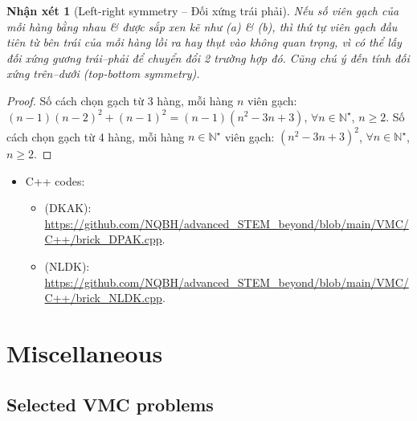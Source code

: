 \documentclass{article}
\newtheorem{nhanxet}{Nhận xét}
\begin{document}
\begin{nhanxet}[Left-right symmetry -- Đối xứng trái phải]
	Nếu số viên gạch của mỗi hàng bằng nhau \& được sắp xen kẽ như (a) \& (b), thì thứ tự viên gạch đầu tiên từ bên trái của mỗi hàng lồi ra hay thụt vào không quan trọng, vì có thể lấy đối xứng gương trái--phải để chuyển đổi 2 trường hợp đó. Cũng chú ý đến tính đối xứng trên--dưới (top-bottom symmetry).
\end{nhanxet}

\begin{proof}
	Số cách chọn gạch từ 3 hàng, mỗi hàng $n$ viên gạch: $(n - 1)(n - 2)^2 + (n - 1)^2 = (n - 1)(n^2 - 3n + 3)$, $\forall n\in\mathbb{N}^\star$, $n\ge2$. Số cách chọn gạch từ 4 hàng, mỗi hàng $n\in\mathbb{N}^\star$ viên gạch: $(n^2 - 3n + 3)^2$, $\forall n\in\mathbb{N}^\star$, $n\ge2$.
\end{proof}

\begin{itemize}
	\item C++ codes:
	\begin{itemize}
		\item (DKAK): \url{https://github.com/NQBH/advanced_STEM_beyond/blob/main/VMC/C++/brick_DPAK.cpp}.
		\item (NLDK): \url{https://github.com/NQBH/advanced_STEM_beyond/blob/main/VMC/C++/brick_NLDK.cpp}.
	\end{itemize}
\end{itemize}


\section{Miscellaneous}

\subsection{Selected VMC problems}
\end{document}
